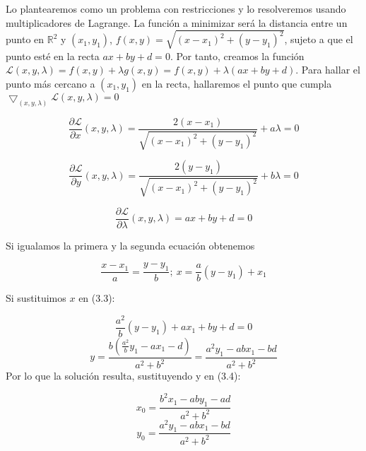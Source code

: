 \documentclass[11pt,leqno]{article}
\theoremstyle{definition}
\begin{document}
\begin{solucion}

Lo plantearemos como un problema con restricciones y lo resolveremos usando multiplicadores de Lagrange. La función a minimizar será la distancia entre un punto en $\mathbb{R}^2$ y $(x_1,y_1)$, $f(x,y)=\sqrt{(x-x_1)^2+(y-y_1)^2}$, sujeto a que el punto esté en la recta $ax+by+d = 0$. Por tanto, creamos la función $\mathcal{L}(x,y,\lambda) = f(x,y) + \lambda g(x,y) = f(x,y) + \lambda(ax+by+d)$. Para hallar el punto más cercano a $(x_1,y_1)$ en la recta, hallaremos el punto que cumpla $\bigtriangledown_{(x,y,\lambda)} \mathcal{L}(x,y,\lambda) = 0$

	\begin{equation}
 		\frac{\partial \mathcal{L}}{\partial x}(x,y,\lambda) =
 			\frac{2(x-x_1)}{\sqrt{(x-x_1)^2+(y-y_1)^2}} + a \lambda = 0
	\end{equation}  

	\begin{equation}
 		\frac{\partial \mathcal{L}}{\partial y}(x,y,\lambda) =
 			\frac{2(y-y_1)}{\sqrt{(x-x_1)^2+(y-y_1)^2}} + b \lambda = 0
	\end{equation}  
	
	\begin{equation}
 		\frac{\partial \mathcal{L}}{\partial \lambda}(x,y,\lambda) = 
 			ax+by+d = 0
	\end{equation}

	Si igualamos la primera y la segunda ecuación obtenemos 
	
	\begin{equation}
		\frac{x-x_1}{a} = \frac{y-y_1}{b};\ x = \frac{a}{b}(y-y_1) + x_1
	\end{equation}
	
	Si sustituimos $x$ en (3.3):
	
	\[ \frac{a^2}{b}(y-y_1) + ax_1 + by + d = 0 \]
	\begin{equation}
	y = \frac{b(\frac{a^2}{b}y_1 - ax_1-d)}{a^2+b^2} =
		\frac{a^2y_1 - abx_1-bd}{a^2+b^2}
	\end{equation}
	Por lo que la solución resulta, sustituyendo y en (3.4):
	
	\[ x_0 = \frac{b^2x_1 - aby_1-ad}{a^2+b^2} \]
	\[ y_0 = \frac{a^2y_1 - abx_1-bd}{a^2+b^2} \]
	
	
\end{solucion}
\end{document}
